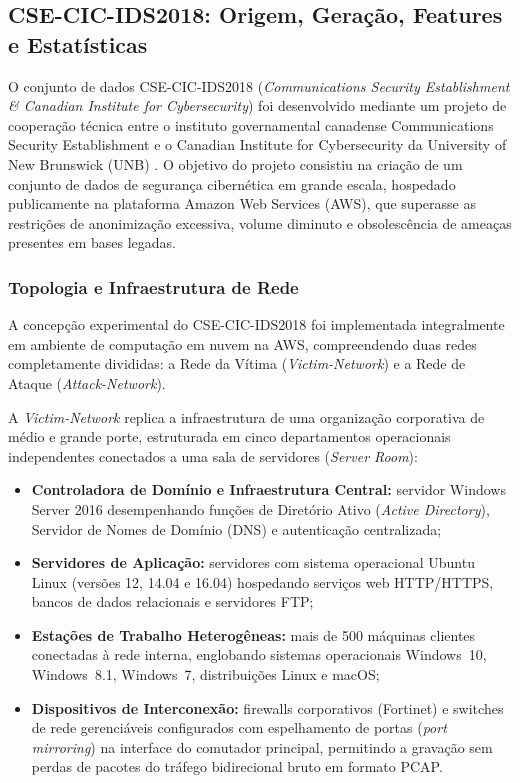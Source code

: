 \subsection{CSE-CIC-IDS2018: Origem, Geração, Features e Estatísticas}
\label{subsec:cse_cic_ids2018}

O conjunto de dados CSE-CIC-IDS2018 (\emph{Communications Security Establishment \& Canadian Institute for Cybersecurity}) foi desenvolvido mediante um projeto de cooperação técnica entre o instituto governamental canadense Communications Security Establishment e o Canadian Institute for Cybersecurity da University of New Brunswick (UNB) \cite{Sharafaldin2018TowardGA}. O objetivo do projeto consistiu na criação de um conjunto de dados de segurança cibernética em grande escala, hospedado publicamente na plataforma Amazon Web Services (AWS), que superasse as restrições de anonimização excessiva, volume diminuto e obsolescência de ameaças presentes em bases legadas.

\subsubsection{Topologia e Infraestrutura de Rede}

A concepção experimental do CSE-CIC-IDS2018 foi implementada integralmente em ambiente de computação em nuvem na AWS, compreendendo duas redes completamente divididas: a Rede da Vítima (\emph{Victim-Network}) e a Rede de Ataque (\emph{Attack-Network}).

A \emph{Victim-Network} replica a infraestrutura de uma organização corporativa de médio e grande porte, estruturada em cinco departamentos operacionais independentes conectados a uma sala de servidores (\emph{Server Room}):
\begin{itemize}
    \item \textbf{Controladora de Domínio e Infraestrutura Central:} servidor Windows Server 2016 desempenhando funções de Diretório Ativo (\emph{Active Directory}), Servidor de Nomes de Domínio (DNS) e autenticação centralizada;
    \item \textbf{Servidores de Aplicação:} servidores com sistema operacional Ubuntu Linux (versões 12, 14.04 e 16.04) hospedando serviços web HTTP/HTTPS, bancos de dados relacionais e servidores FTP;
    \item \textbf{Estações de Trabalho Heterogêneas:} mais de 500 máquinas clientes conectadas à rede interna, englobando sistemas operacionais Windows~10, Windows~8.1, Windows~7, distribuições Linux e macOS;
    \item \textbf{Dispositivos de Interconexão:} firewalls corporativos (Fortinet) e switches de rede gerenciáveis configurados com espelhamento de portas (\emph{port mirroring}) na interface do comutador principal, permitindo a gravação sem perdas de pacotes do tráfego bidirecional bruto em formato PCAP.
\end{itemize}

